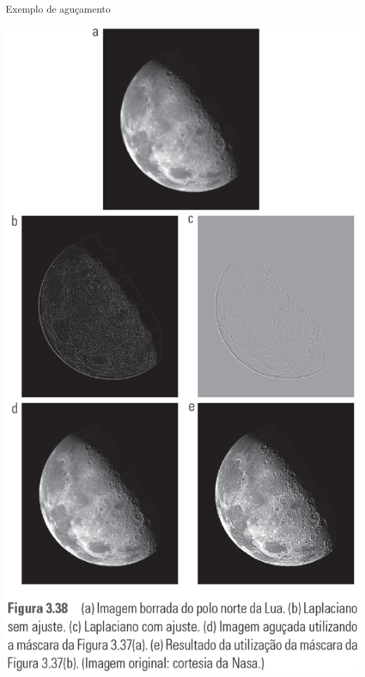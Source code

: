       \begin{slide}[toc=]{Exemplo de aguçamento}
      \begin{center}
          \includegraphics[height=0.75\textheight]{figs/fig0338}
      \end{center}  
      \end{slide}

